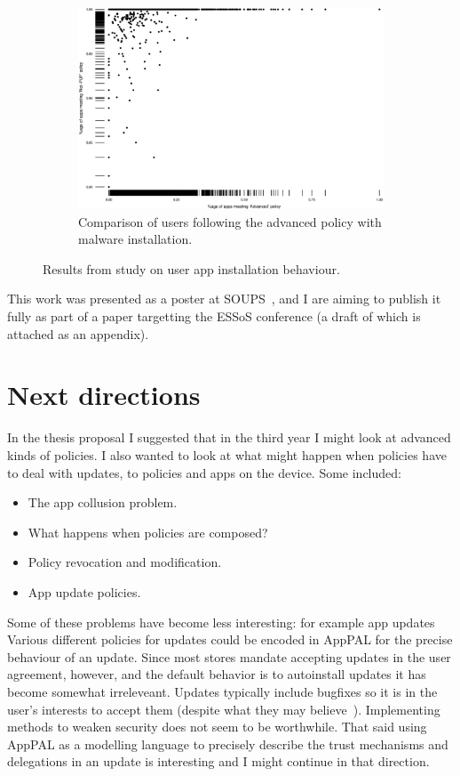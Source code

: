 \documentclass[a4paper]{scrartcl}
\begin{document}
\begin{figure}
  \begin{subfigure}[b]{\linewidth}
    \includegraphics[width=\linewidth]{./images/compare-2yr.eps}
    \caption{Comparison of users following the advanced policy with malware installation.}
    \label{sfig:compare}
  \end{subfigure}

  \caption{Results from study on user app installation behaviour.}
  \label{fig:lin}
\end{figure}

This work was presented as a poster at SOUPS~\citep{Hallett:2015ty}, and I are aiming to publish it fully as part of a paper targetting the ESSoS conference (a draft of which is attached as an appendix).

\section{Next directions}

In the thesis proposal I suggested that in the third year I might look at advanced kinds of policies.
I also wanted to look at what might happen when policies have to deal with updates, to policies and apps on the device.
Some included:
\begin{itemize}
  \item The app collusion problem.
  \item What happens when policies are composed?
  \item Policy revocation and modification.
  \item App update policies.
\end{itemize}

Some of these problems have become less interesting: for example app updates
Various different policies for updates could be encoded in AppPAL for the precise behaviour of an update.
Since most stores mandate accepting updates in the user agreement, however, and the default behavior is to autoinstall updates it has become somewhat irreleveant.
Updates typically include bugfixes so it is in the user's interests to accept them (despite what they may believe~\citep{Vaniea:2014fk}).
Implementing methods to weaken security does not seem to be worthwhile.
That said using AppPAL as a modelling language to precisely describe the trust mechanisms and delegations in an update is interesting and I might continue in that direction.
\end{document}
